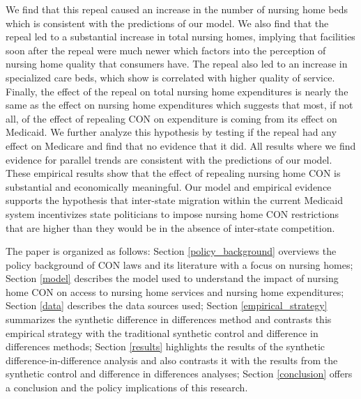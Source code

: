 \documentclass[../Main.tex]{subfiles}
\begin{document}
We find that this repeal caused an increase in the number of nursing home beds which is consistent with the predictions of our model. We also find that the repeal led to a substantial increase in total nursing homes, implying that facilities soon after the repeal were much newer which factors into the perception of nursing home quality that consumers have. The repeal also led to an increase in specialized care beds, which \citet{grabowski2010quality} show is correlated with higher quality of service. Finally, the effect of the repeal on total nursing home expenditures is nearly the same as the effect on nursing home expenditures which suggests that most, if not all, of the effect of repealing CON on expenditure is coming from its effect on Medicaid. We further analyze this hypothesis by testing if the repeal had any effect on Medicare and find that no evidence that it did. All results where we find evidence for parallel trends are consistent with the predictions of our model. These empirical results show that the effect of repealing nursing home CON is substantial and economically meaningful. Our model and empirical evidence supports the hypothesis that inter-state migration within the current Medicaid system incentivizes state politicians to impose nursing home CON restrictions that are higher than they would be in the absence of inter-state competition.

The paper is organized as follows: Section \ref{policy_background} overviews the policy background of CON laws and its literature with a focus on nursing homes; Section \ref{model} describes the model used to understand the impact of nursing home CON on access to nursing home services and nursing home expenditures; Section \ref{data} describes the data sources used; Section \ref{empirical_strategy} summarizes the synthetic difference in differences method and contrasts this empirical strategy with the traditional synthetic control and difference in differences methods; Section \ref{results} highlights the results of the synthetic difference-in-difference analysis and also contrasts it with the results from the synthetic control and difference in differences analyses; Section \ref{conclusion} offers a conclusion and the policy implications of this research.
\end{document}
